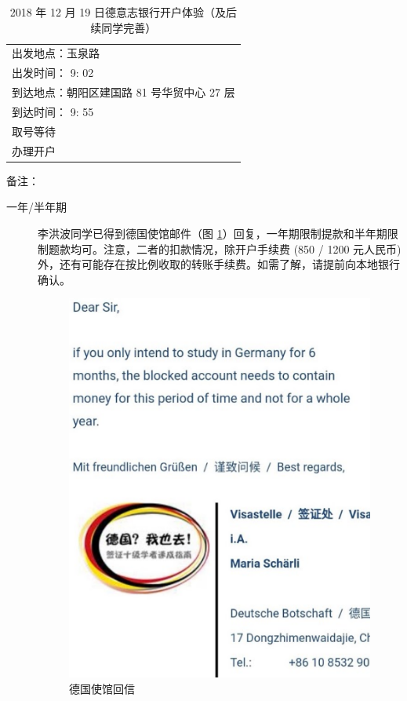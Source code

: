 \documentclass{article}
\begin{document}
\begin{table}[htbp]
\caption{2018 年 12 月 19 日德意志银行开户体验（及后续同学完善）}
\label{tb:opening-Dec-19}
\centering
\begin{tabular}{l}
\toprule
出发地点：玉泉路 \\
出发时间： 9: 02 \\
到达地点：朝阳区建国路 81 号华贸中心 27 层 \\
到达时间： 9: 55 \\
取号等待 \\
办理开户 \\ \bottomrule
\end{tabular}
\end{table}
\noindent
备注：
\begin{description}
\item[一年/半年期] 李洪波同学已得到德国使馆邮件（图 \ref{fig:email}）回复，一年期限制提款和半年期限制题款均可。注意，二者的扣款情况，除开户手续费 (850 / 1200 元人民币) 外，还有可能存在按比例收取的转账手续费。如需了解，请提前向本地银行确认。
\begin{figure}[htbp]
  \centering
  \includegraphics[height=.25\textheight]{email-from-Visa}
  \caption{德国使馆回信}
  \label{fig:email}
\end{figure}

\end{description}
\end{document}
